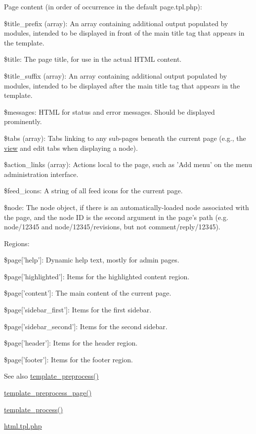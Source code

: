 Page content (in order of occurrence in the default page.tpl.php):
\begin{DoxyItemize}
\item \$title\_\-prefix (array): An array containing additional output populated by modules, intended to be displayed in front of the main title tag that appears in the template.
\item \$title: The page title, for use in the actual HTML content.
\item \$title\_\-suffix (array): An array containing additional output populated by modules, intended to be displayed after the main title tag that appears in the template.
\item \$messages: HTML for status and error messages. Should be displayed prominently.
\item \$tabs (array): Tabs linking to any sub-\/pages beneath the current page (e.g., the \hyperlink{classview}{view} and edit tabs when displaying a node).
\item \$action\_\-links (array): Actions local to the page, such as 'Add menu' on the menu administration interface.
\item \$feed\_\-icons: A string of all feed icons for the current page.
\item \$node: The node object, if there is an automatically-\/loaded node associated with the page, and the node ID is the second argument in the page's path (e.g. node/12345 and node/12345/revisions, but not comment/reply/12345).
\end{DoxyItemize}

Regions:
\begin{DoxyItemize}
\item \$page\mbox{[}'help'\mbox{]}: Dynamic help text, mostly for admin pages.
\item \$page\mbox{[}'highlighted'\mbox{]}: Items for the highlighted content region.
\item \$page\mbox{[}'content'\mbox{]}: The main content of the current page.
\item \$page\mbox{[}'sidebar\_\-first'\mbox{]}: Items for the first sidebar.
\item \$page\mbox{[}'sidebar\_\-second'\mbox{]}: Items for the second sidebar.
\item \$page\mbox{[}'header'\mbox{]}: Items for the header region.
\item \$page\mbox{[}'footer'\mbox{]}: Items for the footer region.
\end{DoxyItemize}

\begin{DoxySeeAlso}{See also}
\hyperlink{includes_2theme_8inc_a3eeb7bcdba7ef4859f99586da264d347}{template\_\-preprocess()} 

\hyperlink{includes_2theme_8inc_a128dae24f990d8ba4710ac78b0584c11}{template\_\-preprocess\_\-page()} 

\hyperlink{includes_2theme_8inc_a9b4d56c55dab2c59b7af6f71d6b1a940}{template\_\-process()} 

\hyperlink{html_8tpl_8php}{html.tpl.php} 
\end{DoxySeeAlso}
